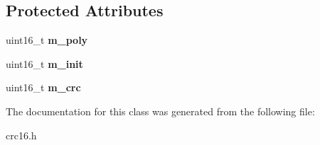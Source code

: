\subsection*{Protected Attributes}
\begin{DoxyCompactItemize}
\item 
\hypertarget{class_c_r_c16_ae3d38db69627b3335b5a5f008057f98c}{uint16\-\_\-t {\bfseries m\-\_\-poly}}\label{class_c_r_c16_ae3d38db69627b3335b5a5f008057f98c}

\item 
\hypertarget{class_c_r_c16_a85c28fd3fef555b4d25b0d18186fae6a}{uint16\-\_\-t {\bfseries m\-\_\-init}}\label{class_c_r_c16_a85c28fd3fef555b4d25b0d18186fae6a}

\item 
\hypertarget{class_c_r_c16_a010ae9e2779e15bd4baf9a56980cd272}{uint16\-\_\-t {\bfseries m\-\_\-crc}}\label{class_c_r_c16_a010ae9e2779e15bd4baf9a56980cd272}

\end{DoxyCompactItemize}


The documentation for this class was generated from the following file\-:\begin{DoxyCompactItemize}
\item 
crc16.\-h\end{DoxyCompactItemize}
